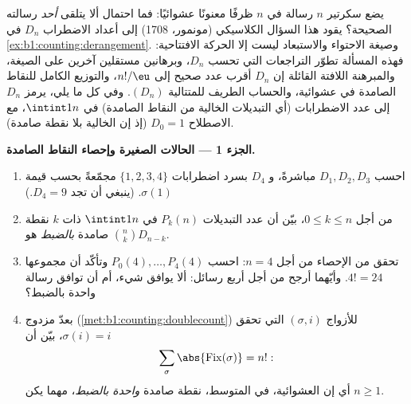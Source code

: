 \begin{problem}\label{pb:b1:counting:1}
يضع سكرتير $n$ رسالة في $n$ ظرفًا معنونًا عشوائيًا:
فما احتمال ألا يتلقى \emph{أحد} رسالته الصحيحة؟
يقود هذا السؤال الكلاسيكي (مونمور، 1708) إلى أعداد الاضطراب
$D_n$ في \cref{ex:b1:counting:derangement}. وصيغة الاحتواء
والاستبعاد ليست إلا الحركة الافتتاحية: فهذه المسألة تطوّر
التراجعات التي تحسب $D_n$، وبرهانين مستقلين آخرين على الصيغة،
والمبرهنة اللافتة القائلة إن $D_n$ أقرب عدد صحيح إلى $n!/\eu$،
والتوزيع الكامل للنقاط الصامدة في  عشوائية، والحساب
الطريف للمتتالية $(D_n)$.
وفي كل ما يلي، يرمز $D_n$ إلى عدد الاضطرابات (أي التبديلات
الخالية من النقاط الصامدة) في $\intint1n$، مع الاصطلاح $D_0 = 1$
(إذ إن  الخالية بلا نقطة صامدة).

\medskip
\noindent\textbf{الجزء 1 --- الحالات الصغيرة وإحصاء النقاط
الصامدة.}
\begin{enumerate}
  \item احسب $D_1, D_2, D_3$ مباشرةً، و $D_4$ بسرد اضطرابات
        $\{1, 2, 3, 4\}$ مجمّعةً بحسب قيمة
        $\sigma(1)$. (ينبغي أن تجد $D_4 = 9$.)
  \item من أجل $0 \leq k \leq n$، بيّن أن عدد التبديلات
        $P_k(n)$ في $\intint1n$ ذات $k$ نقطة صامدة
        \emph{بالضبط} هو $\binom nk D_{n-k}$.
  \item تحقق من الإحصاء من أجل $n = 4$: احسب $P_0(4), \dots,
        P_4(4)$ وتأكّد أن مجموعها $4! = 24$. وأيّهما أرجح من أجل
        أربع رسائل: ألا يوافق شيء، أم أن توافق رسالة واحدة بالضبط؟
  \item بعدّ مزدوج (\cref{met:b1:counting:doublecount})
        للأزواج $(\sigma, i)$ التي تحقق $\sigma(i) = i$، بيّن أن
        \[
        \sum_{\sigma} \abs{\mathrm{Fix}(\sigma)} = n! :
        \]
        أي إن  العشوائية، في المتوسط، نقطة صامدة
        \emph{واحدة بالضبط}، مهما يكن $n \geq 1$.
\end{enumerate}


\end{problem}
